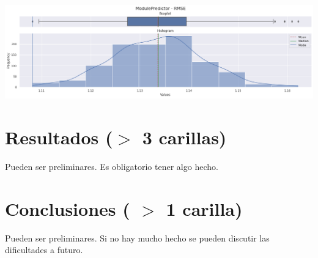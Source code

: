 \documentclass[11pt,a4paper,twoside]{thesis}
\begin{document}
\begin{center}
	\includegraphics[width=16cm]{./images/metrics-DeepFM-RMSE.png}
\end{center}


\chapter{Resultados ($>$ 3 carillas)}

Pueden ser preliminares. Es obligatorio tener algo hecho.


\chapter{Conclusiones ( $>$ 1 carilla)} 

Pueden ser preliminares. 
Si no hay mucho hecho se pueden discutir las dificultades a futuro.


\backmatter
%
\end{document}
